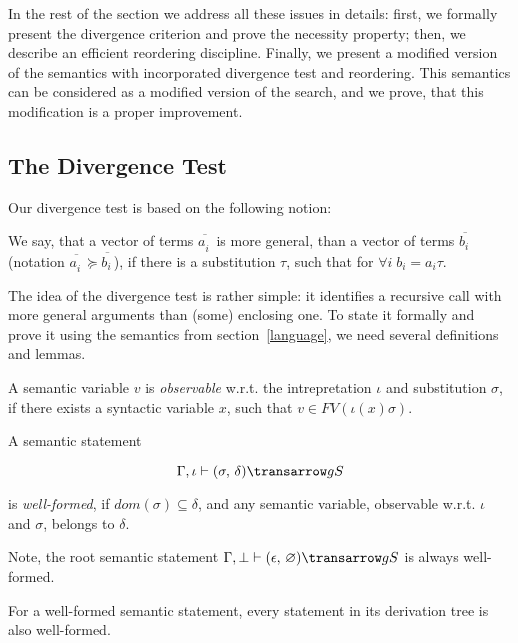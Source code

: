 In the rest of the section we address all these issues in details: first, we formally present the divergence
criterion and prove the necessity property; then, we describe an efficient reordering discipline. Finally, we present a
modified version of the semantics with incorporated divergence test and reordering. This semantics can be
considered as a modified version of the search, and we prove, that this modification is a proper improvement.

\subsection{The Divergence Test}

Our divergence test is based on the following notion:

\begin{definition}
\normalfont 
We say, that a vector of terms $\overline{a^{\phantom{x}}_i}$ is more general, than a vector of terms $\overline{b^{\phantom{x}}_i}$ (notation 
$\overline{a^{\phantom{x}}_i}\succeq\overline{b^{\phantom{x}}_i}$), if there is a substitution $\tau$, such that for $\forall i\;b_i = a_i \tau$.
\end{definition}

The idea of the divergence test is rather simple: it identifies a recursive call with more general arguments 
than (some) enclosing one. To state it formally and prove it using the semantics from section~\ref{language}, we need several definitions and lemmas.

\begin{definition}
\normalfont
A semantic variable $v$ is \emph{observable} w.r.t. the intrepretation $\iota$ and substitution $\sigma$, if there exists 
a syntactic variable $x$, such that \mbox{$v \in FV(\iota(x) \sigma)$}.
\end{definition}

\begin{definition}
\normalfont
A semantic statement 

$$
\otrans{\Gamma,\iota}{(\sigma,\,\delta)}{g}{S}
$$ 

\noindent is \emph{well-formed}, if \mbox{$dom(\sigma) \subseteq \delta$}, and any semantic variable, observable w.r.t. $\iota$ and $\sigma$, belongs to $\delta$.  
\end{definition}

Note, the root semantic statement \mbox{$\otrans{\Gamma,\bot}{(\epsilon,\,\emptyset)}{g}{S}$} is always well-formed.

\begin{lemma}
\label{one}
\normalfont
 For a well-formed semantic statement, every statement in its derivation tree is also well-formed.
\end{lemma}

